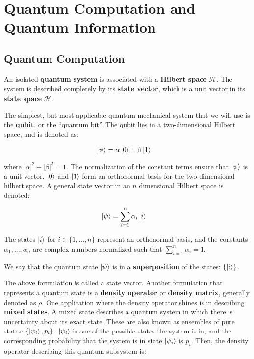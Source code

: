 \chapter{Quantum Computation and Quantum Information}
\label{ch:qc-prelim}

\section{Quantum Computation}
\label{sec:qc}

An isolated \textbf{quantum system} is associated with a \textbf{Hilbert space} $\mathcal{H}$. The system is described completely by its \textbf{state vector}, which is a unit vector in its \textbf{state space} $\mathcal{H}$.

The simplest, but most applicable quantum mechanical system that we will use is the \textbf{qubit}, or the ``quantum bit''. The qubit lies in a two-dimensional Hilbert space, and is denoted as:

\begin{align}
    \ket{\psi} &= \alpha \ket{0} + \beta \ket{1}
\end{align}

where $|\alpha|^2 + |\beta|^2 = 1$. The normalization of the constant terms ensure that $\ket{\psi}$ is a unit vector. $\ket{0}$ and $\ket{1}$ form an orthonormal basis for the two-dimensional hilbert space. A general state vector in an $n$ dimensional Hilbert space is denoted:

\begin{align}
    \ket{\psi} &= \sum_{i=1}^n \alpha_i\ket{i}
\end{align}

The states $\ket{i}$ for $i \in \{1,...,n\}$ represent an orthonormal basis, and the constants $\alpha_1,...,\alpha_n$ are complex numbers normalized such that $\sum_{i=1}^n \alpha_i = 1$.

We say that the quantum state $\ket{\psi}$ is in a \textbf{superposition} of the states: $\{\ket{i}\}$.

The above formulation is called a state vector. Another formulation that represents a quantum state is a \textbf{density operator} or \textbf{density matrix}, generally denoted as $\rho$. One application where the density operator shines is in describing \textbf{mixed states}. A mixed state describes a quantum system in which there is uncertainty about its exact state. These are also known as ensembles of pure states: $\{\ket{\psi_i}, p_i\}$. $\ket{\psi_i}$ is one of the possible states the system is in, and the corresponding probability that the system is in state $\ket{\psi_i}$ is $p_i$. Then, the density operator describing this quantum subsystem is:

